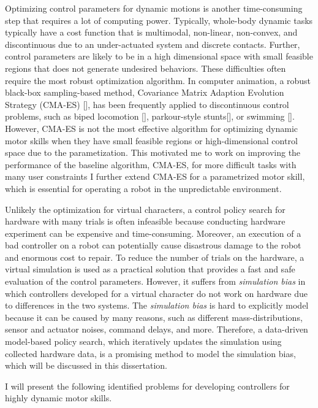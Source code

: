 Optimizing control parameters for dynamic motions is another time-consuming
step that requires a lot of computing power.
Typically, whole-body dynamic tasks typically have a cost function
that is multimodal, non-linear, non-convex, and discontinuous due to 
an under-actuated system and discrete contacts.
Further, control parameters are likely to be in a high dimensional
space with small feasible regions that does not generate undesired behaviors.
These difficulties often require the most robust optimization algorithm.
In computer animation, a robust black-box sampling-based method, 
Covariance Matrix Adaption Evolution Strategy (CMA-ES) [], has been frequently
applied to discontinuous control problems, such as biped locomotion [],
parkour-style stunts[], or swimming [].
However, CMA-ES is not the most effective algorithm for
optimizing dynamic motor skills when they have small feasible regions
or high-dimensional control space due to the parametization.
This motivated me to work on improving the performance of the baseline
algorithm, CMA-ES, for more difficult tasks with many user constraints
I further extend CMA-ES for a parametrized motor skill, which is essential
for operating a robot in the unpredictable environment.

Unlikely the optimization for virtual characters,
a control policy search for hardware with many trials is often infeasible
because conducting hardware experiment can be expensive and time-consuming.
Moreover, an execution of a bad controller on a robot can potentially cause
disastrous damage to the robot and enormous cost to repair.
To reduce the number of trials on the hardware, a virtual simulation 
is used as a practical solution that provides a fast and safe evaluation
of the control parameters.
However, it suffers from \emph{simulation bias} in which
controllers developed for a virtual character do not work on hardware due
to differences in the two systems.
The \emph{simulation bias} is hard to explicitly model because it can
be caused by many reasons, such as different mass-distributions, sensor 
and actuator noises, command delays, and more.
Therefore, a data-driven model-based policy search, which iteratively 
updates the simulation using collected hardware data, is a promising method 
to model the simulation bias, which will be discussed in this dissertation.

I will present the following identified problems for developing 
controllers for highly dynamic motor skills.

